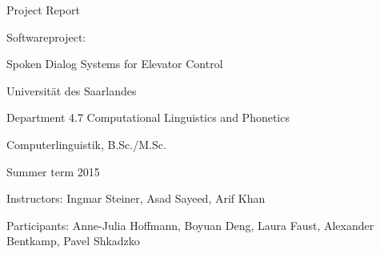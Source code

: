 
\begin{center} Project Report \end{center}
\hspace{1cm}
\begin{center} Softwareproject: \end{center}
\begin{center}Spoken Dialog Systems for Elevator Control \end{center}
\begin{center} Universität des Saarlandes \end{center}
\begin{center} Department 4.7 Computational Linguistics and Phonetics \end{center}
\begin{center} Computerlinguistik, B.Sc./M.Sc. \end{center}
\begin{center} Summer term 2015 \end{center}

\hspace{1cm}
\begin{center}Instructors: Ingmar Steiner, Asad Sayeed, Arif Khan \end{center}

\begin{center} Participants: Anne-Julia Hoffmann, Boyuan Deng, Laura Faust, Alexander Bentkamp, Pavel Shkadzko \end{center}
